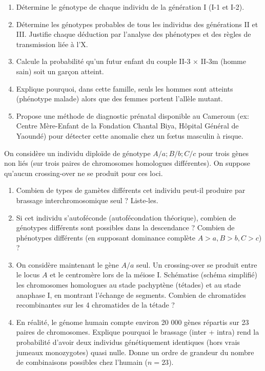 \documentclass[11pt]{article}
\begin{document}
\begin{exercice}
\begin{enumerate}
    \item Détermine le génotype de chaque individu de la génération I (I-1 et I-2).
    \item Détermine les génotypes probables de tous les individus des générations II et III. Justifie chaque déduction par l'analyse des phénotypes et des règles de transmission liée à l'X.
    \item Calcule la probabilité qu'un futur enfant du couple II-3 $\times$ II-3m (homme sain) soit un garçon atteint.
    \item Explique pourquoi, dans cette famille, seuls les hommes sont atteints (phénotype malade) alors que des femmes portent l'allèle mutant.
    \item Propose une méthode de diagnostic prénatal disponible au Cameroun (ex: Centre Mère-Enfant de la Fondation Chantal Biya, Hôpital Général de Yaoundé) pour détecter cette anomalie chez un fœtus masculin à risque.
\end{enumerate}
\end{exercice}

\begin{exercice}
On considère un individu diploïde de génotype $A/a ; B/b ; C/c$ pour trois gènes non liés (sur trois paires de chromosomes homologues différentes). On suppose qu'aucun crossing-over ne se produit pour ces loci.
\begin{enumerate}
    \item Combien de types de gamètes différents cet individu peut-il produire par brassage interchromosomique seul ? Liste-les.
    \item Si cet individu s'autoféconde (autofécondation théorique), combien de génotypes différents sont possibles dans la descendance ? Combien de phénotypes différents (en supposant dominance complète $A>a, B>b, C>c$) ?
    \item On considère maintenant le gène $A/a$ seul. Un crossing-over se produit entre le locus $A$ et le centromère lors de la méiose I. Schématise (schéma simplifié) les chromosomes homologues au stade pachyptène (tétades) et au stade anaphase I, en montrant l'échange de segments. Combien de chromatides recombinantes sur les 4 chromatides de la tétade ?
    \item En réalité, le génome humain compte environ 20 000 gènes répartis sur 23 paires de chromosomes. Explique pourquoi le brassage (inter + intra) rend la probabilité d'avoir deux individus génétiquement identiques (hors vrais jumeaux monozygotes) quasi nulle. Donne un ordre de grandeur du nombre de combinaisons possibles chez l'humain ($n=23$).
\end{enumerate}
\end{exercice}
\end{document}
